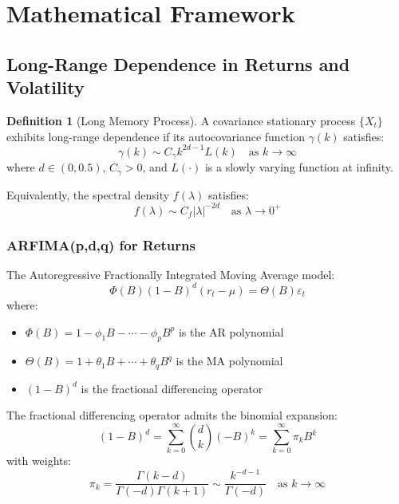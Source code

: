 \documentclass[11pt,a4paper]{article}
\theoremstyle{definition}
\newtheorem{definition}{Definition}[section]
\begin{document}
\section{Mathematical Framework}

\subsection{Long-Range Dependence in Returns and Volatility}

\begin{definition}[Long Memory Process]
A covariance stationary process $\{X_t\}$ exhibits long-range dependence if its autocovariance function $\gamma(k)$ satisfies:
\begin{equation}
    \gamma(k) \sim C_\gamma k^{2d-1} L(k) \quad \text{as } k \to \infty
\end{equation}
where $d \in (0, 0.5)$, $C_\gamma > 0$, and $L(\cdot)$ is a slowly varying function at infinity.
\end{definition}

Equivalently, the spectral density $f(\lambda)$ satisfies:
\begin{equation}
    f(\lambda) \sim C_f |\lambda|^{-2d} \quad \text{as } \lambda \to 0^+
\end{equation}

\subsubsection{ARFIMA(p,d,q) for Returns}

The Autoregressive Fractionally Integrated Moving Average model:
\begin{equation}
    \Phi(B)(1-B)^d (r_t - \mu) = \Theta(B)\varepsilon_t
\end{equation}
where:
\begin{itemize}
    \item $\Phi(B) = 1 - \phi_1 B - \cdots - \phi_p B^p$ is the AR polynomial
    \item $\Theta(B) = 1 + \theta_1 B + \cdots + \theta_q B^q$ is the MA polynomial
    \item $(1-B)^d$ is the fractional differencing operator
\end{itemize}

The fractional differencing operator admits the binomial expansion:
\begin{equation}
    (1-B)^d = \sum_{k=0}^{\infty} \binom{d}{k}(-B)^k = \sum_{k=0}^{\infty} \pi_k B^k
\end{equation}
with weights:
\begin{equation}
    \pi_k = \frac{\Gamma(k-d)}{\Gamma(-d)\Gamma(k+1)} \sim \frac{k^{-d-1}}{\Gamma(-d)} \quad \text{as } k \to \infty
\end{equation}
\end{document}
